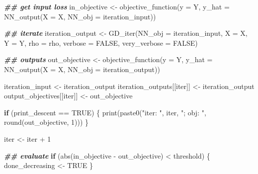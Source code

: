 \documentclass[
]{book}
\newenvironment{Shaded}{\begin{snugshade}}{\end{snugshade}}
\newcommand{\AttributeTok}[1]{\textcolor[rgb]{0.77,0.63,0.00}{#1}}
\newcommand{\ConstantTok}[1]{\textcolor[rgb]{0.00,0.00,0.00}{#1}}
\newcommand{\ControlFlowTok}[1]{\textcolor[rgb]{0.13,0.29,0.53}{\textbf{#1}}}
\newcommand{\DecValTok}[1]{\textcolor[rgb]{0.00,0.00,0.81}{#1}}
\newcommand{\DocumentationTok}[1]{\textcolor[rgb]{0.56,0.35,0.01}{\textbf{\textit{#1}}}}
\newcommand{\FunctionTok}[1]{\textcolor[rgb]{0.00,0.00,0.00}{#1}}
\newcommand{\NormalTok}[1]{#1}
\newcommand{\OtherTok}[1]{\textcolor[rgb]{0.56,0.35,0.01}{#1}}
\newcommand{\SpecialCharTok}[1]{\textcolor[rgb]{0.00,0.00,0.00}{#1}}
\newcommand{\StringTok}[1]{\textcolor[rgb]{0.31,0.60,0.02}{#1}}
\begin{document}
\begin{Shaded}
\begin{Highlighting}[]
    \DocumentationTok{\#\# get input loss}
\NormalTok{    in\_objective }\OtherTok{\textless{}{-}} \FunctionTok{objective\_function}\NormalTok{(}\AttributeTok{y =}\NormalTok{ Y,}
                                       \AttributeTok{y\_hat =} \FunctionTok{NN\_output}\NormalTok{(}\AttributeTok{X =}\NormalTok{ X,}
                                                         \AttributeTok{NN\_obj =}\NormalTok{ iteration\_input))}
    
    \DocumentationTok{\#\# iterate}
\NormalTok{    iteration\_output }\OtherTok{\textless{}{-}} \FunctionTok{GD\_iter}\NormalTok{(}\AttributeTok{NN\_obj =}\NormalTok{ iteration\_input,}
                                \AttributeTok{X =}\NormalTok{ X,}
                                \AttributeTok{Y =}\NormalTok{ Y,}
                                \AttributeTok{rho =}\NormalTok{ rho,}
                                \AttributeTok{verbose =} \ConstantTok{FALSE}\NormalTok{,}
                                \AttributeTok{very\_verbose =} \ConstantTok{FALSE}\NormalTok{)}

    \DocumentationTok{\#\# outputs}
\NormalTok{    out\_objective }\OtherTok{\textless{}{-}} \FunctionTok{objective\_function}\NormalTok{(}\AttributeTok{y =}\NormalTok{ Y,}
                                        \AttributeTok{y\_hat =} \FunctionTok{NN\_output}\NormalTok{(}\AttributeTok{X =}\NormalTok{ X,}
                                                          \AttributeTok{NN\_obj =}\NormalTok{ iteration\_output))}
    
\NormalTok{    iteration\_input }\OtherTok{\textless{}{-}}\NormalTok{ iteration\_output}
\NormalTok{    iteration\_outputs[[iter]] }\OtherTok{\textless{}{-}}\NormalTok{ iteration\_output}
\NormalTok{    output\_objectives[[iter]] }\OtherTok{\textless{}{-}}\NormalTok{ out\_objective}
    
    \ControlFlowTok{if}\NormalTok{ (print\_descent }\SpecialCharTok{==} \ConstantTok{TRUE}\NormalTok{) \{}
      \FunctionTok{print}\NormalTok{(}\FunctionTok{paste0}\NormalTok{(}\StringTok{"iter: "}\NormalTok{, iter, }\StringTok{"; obj: "}\NormalTok{, }\FunctionTok{round}\NormalTok{(out\_objective, }\DecValTok{1}\NormalTok{)))}
\NormalTok{    \}}
    
\NormalTok{    iter }\OtherTok{\textless{}{-}}\NormalTok{ iter }\SpecialCharTok{+} \DecValTok{1}
    
    \DocumentationTok{\#\# evaluate}
    \ControlFlowTok{if}\NormalTok{ (}\FunctionTok{abs}\NormalTok{(in\_objective }\SpecialCharTok{{-}}\NormalTok{ out\_objective) }\SpecialCharTok{\textless{}}\NormalTok{ threshold) \{}
\NormalTok{      done\_decreasing }\OtherTok{\textless{}{-}} \ConstantTok{TRUE}
\NormalTok{    \}}
    

\end{Highlighting}
\end{Shaded}
\end{document}
